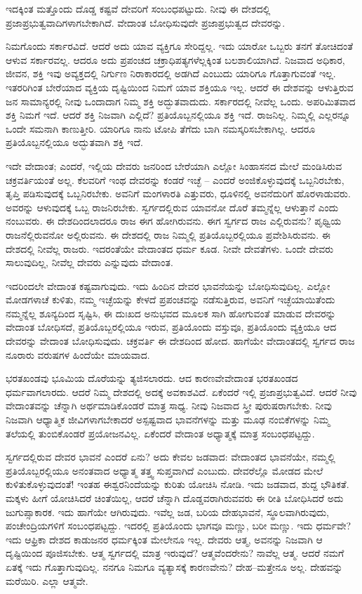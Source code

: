 ಇದಕ್ಕಿಂತ ಮತ್ತೊಂದು ದೊಡ್ಡ ಕಷ್ಟವೆ ದೇವರಿಗೆ ಸಂಬಂಧಪಟ್ಟುದು. ನೀವು ಈ ದೇಶದಲ್ಲಿ ಪ್ರಜಾಪ್ರಭುತ್ವವಾದಿಗಳಾಗಬೇಕಾಗಿದೆ. ವೇದಾಂತ ಬೋಧಿಸುವುದೇ ಪ್ರಜಾಪ್ರಭುತ್ವದ ದೇವರನ್ನು.

ನಿಮಗೊಂದು ಸರ್ಕಾರವಿದೆ. ಆದರೆ ಅದು ಯಾವ ವ್ಯಕ್ತಿಗೂ ಸೇರಿದ್ದಲ್ಲ. ಇದು ಯಾರೋ ಒಬ್ಬರು ತನಗೆ ತೋಚಿದಂತೆ ಆಳುವ ಸರ್ಕಾರವಲ್ಲ. ಆದರೂ ಅದು ಪ್ರಪಂಚದ ಚಕ್ರಾಧಿಪತ್ಯಗಳೆಲ್ಲಕ್ಕಿಂತ ಬಲಶಾಲಿಯಾಗಿದೆ. ನಿಜವಾದ ಅಧಿಕಾರ, ಜೀವನ, ಶಕ್ತಿ ಇವು ಅವ್ಯಕ್ತದಲ್ಲಿ ನಿರ್ಗುಣ ನಿರಾಕಾರದಲ್ಲಿ ಅಡಗಿದೆ ಎಂಬುದು ಯಾರಿಗೂ ಗೊತ್ತಾಗುವಂತೆ ಇಲ್ಲ. ಇತರರಿಗಿಂತ ಬೇರೆಯಾದ ವ್ಯಕ್ತಿಯ ದೃಷ್ಟಿಯಿಂದ ನಿಮಗೆ ಯಾವ ಶಕ್ತಿಯೂ ಇಲ್ಲ. ಆದರೆ ಈ ದೇಶವನ್ನು ಆಳುತ್ತಿರುವ ಜನ ಸಾಮಾನ್ಯರಲ್ಲಿ ನೀವು ಒಂದಾದಾಗ ನಿಮ್ಮ ಶಕ್ತಿ ಅದ್ಭುತವಾದುದು. ಸರ್ಕಾರದಲ್ಲಿ ನೀವೆಲ್ಲ ಒಂದು. ಅಪರಿಮಿತವಾದ ಶಕ್ತಿ ನಿಮಗೆ ಇದೆ. ಆದರೆ ಶಕ್ತಿ ನಿಜವಾಗಿ ಎಲ್ಲಿದೆ? ಪ್ರತಿಯೊಬ್ಬನಲ್ಲಿಯೂ ಶಕ್ತಿ ಇದೆ. ರಾಜನಿಲ್ಲ. ನಿಮ್ಮಲ್ಲಿ ಎಲ್ಲರನ್ನೂ ಒಂದೇ ಸಮನಾಗಿ ಕಾಣುತ್ತೀರಿ. ಯಾರಿಗೂ ನಾನು ಟೋಪಿ ತೆಗೆದು ಬಾಗಿ ನಮಸ್ಕರಿಸಬೇಕಾಗಿಲ್ಲ. ಆದರೂ ಪ್ರತಿಯೊಬ್ಬನಲ್ಲಿಯೂ ಅದ್ಭುತವಾಗಿ ಶಕ್ತಿ ಇದೆ.

ಇದೇ ವೇದಾಂತ; ಎಂದರೆ, ಇಲ್ಲಿಯ ದೇವರು ಜನರಿಂದ ಬೇರೆಯಾಗಿ ಎಲ್ಲೋ ಸಿಂಹಾಸನದ ಮೇಲೆ ಮಂಡಿಸಿರುವ ಚಕ್ರವರ್ತಿಯಂತೆ ಅಲ್ಲ. ಕೆಲವರಿಗೆ ಇಂಥ ದೇವರನ್ನು ಕಂಡರೆ ಇಚ್ಛೆ – ಎಂದರೆ ಅಂಜಿಕೊಳ್ಳುವುದಕ್ಕೆ ಒಬ್ಬನಿರಬೇಕು, ತೃಪ್ತಿ ಪಡಿಸುವುದಕ್ಕೆ ಒಬ್ಬನಿರಬೇಕು. ಅವನಿಗೆ ಮಂಗಳಾರತಿ ಎತ್ತುವರು, ಧೂಳಿನಲ್ಲಿ ಅವನೆದುರಿಗೆ ಹೊರಳಾಡುವರು. ಅವರನ್ನು ಆಳುವುದಕ್ಕೆ ಒಬ್ಬ ರಾಜನಿರಬೇಕು. ಸ್ವರ್ಗದಲ್ಲಿರುವ ಯಾವನೋ ದೊರೆ ತಮ್ಮನ್ನೆಲ್ಲ ಆಳುತ್ತಾನೆ ಎಂದು ನಂಬುವರು. ಈ ದೇಶದಿಂದಲಾದರೂ ರಾಜ ಈಗ ಹೋಗಿರುವನು. ಈಗ ಸ್ವರ್ಗದ ರಾಜ ಎಲ್ಲಿರುವನು? ಪೃಥ್ವಿಯ ರಾಜನೆಲ್ಲಿರುವನೋ ಅಲ್ಲಿರುವನು. ಈ ದೇಶದಲ್ಲಿ ರಾಜ ನಿಮ್ಮಲ್ಲಿ ಪ್ರತಿಯೊಬ್ಬರಲ್ಲಿಯೂ ಪ್ರವೇಶಿಸಿರುವನು. ಈ ದೇಶದಲ್ಲಿ ನೀವೆಲ್ಲ ರಾಜರು. ಇದರಂತೆಯೇ ವೇದಾಂತದ ಧರ್ಮ ಕೂಡ. ನೀವೇ ದೇವತೆಗಳು. ಒಂದೇ ದೇವರು ಸಾಲುವುದಿಲ್ಲ, ನೀವೆಲ್ಲ ದೇವರು ಎನ್ನುವುದು ವೇದಾಂತ.

ಇದರಿಂದಲೇ ವೇದಾಂತ ಕಷ್ಟವಾಗುವುದು. ಇದು ಹಿಂದಿನ ದೇವರ ಭಾವನೆಯನ್ನು ಬೋಧಿಸುವುದಿಲ್ಲ. ಎಲ್ಲೋ ಮೋಡಗಳಾಚೆ ಕುಳಿತು, ನಮ್ಮ ಇಚ್ಛೆಯನ್ನು ಕೇಳದೆ ಪ್ರಪಂಚವನ್ನು ನಡೆಸುತ್ತಿರುವ, ಅವನಿಗೆ ಇಚ್ಛೆಯಾಯಿತೆಂದು ನಮ್ಮನ್ನೆಲ್ಲ ಶೂನ್ಯದಿಂದ ಸೃಷ್ಟಿಸಿ, ಈ ದುಃಖದ ಅನುಭವದ ಮೂಲಕ ಸಾಗಿ ಹೋಗುವಂತೆ ಮಾಡುವ ದೇವರನ್ನು ವೇದಾಂತ ಬೋಧಿಸದೆ, ಪ್ರತಿಯೊಬ್ಬರಲ್ಲಿಯೂ ಇರುವ, ಪ್ರತಿಯೊಂದು ವಸ್ತುವೂ, ಪ್ರತಿಯೊಂದು ವ್ಯಕ್ತಿಯೂ ಆದ ದೇವರನ್ನು ವೇದಾಂತ ಬೋಧಿಸುವುದು. ಚಕ್ರವರ್ತಿ ಈ ದೇಶದಿಂದ ಹೋದ. ಹಾಗೆಯೇ ವೇದಾಂತದಲ್ಲಿ ಸ್ವರ್ಗದ ರಾಜ ನೂರಾರು ವರುಷಗಳ ಹಿಂದೆಯೇ ಮಾಯವಾದ.

ಭರತಖಂಡವು ಭೂಮಿಯ ದೊರೆಯನ್ನು ತ್ಯಜಿಸಲಾರದು. ಆದ ಕಾರಣವೇ\break ವೇದಾಂತ ಭರತಖಂಡದ ಧರ್ಮವಾಗಲಾರದು. ಆದರೆ ನಿಮ್ಮ ದೇಶದಲ್ಲಿ ಅದಕ್ಕೆ ಅವಕಾಶವಿದೆ. ಏಕೆಂದರೆ ಇಲ್ಲಿ ಪ್ರಜಾಪ್ರಭುತ್ವವಿದೆ. ಆದರೆ ನೀವು ವೇದಾಂತವನ್ನು ಚೆನ್ನಾಗಿ ಅರ್ಥಮಾಡಿಕೊಂಡರೆ ಮಾತ್ರ ಸಾಧ್ಯ. ನೀವು ನಿಜವಾದ ಸ್ತ್ರೀ ಪುರುಷರಾಗಬೇಕು. ನೀವು ನಿಜವಾಗಿ ಆಧ್ಯಾತ್ಮಿಕ ಜೀವಿಗಳಾಗಬೇಕಾದರೆ ಅಸ್ಪಷ್ಟವಾದ ಭಾವನೆಗಳನ್ನು ಮತ್ತು ಮೂಢ ನಂಬಿಕೆಗಳನ್ನು ನಿಮ್ಮ ತಲೆಯಲ್ಲಿ ತುಂಬಿಕೊಂಡರೆ ಪ್ರಯೋಜನವಿಲ್ಲ. ಏಕೆಂದರೆ ವೇದಾಂತ ಅಧ್ಯಾತ್ಮಕ್ಕೆ ಮಾತ್ರ ಸಂಬಂಧಪಟ್ಟದ್ದು.

ಸ್ವರ್ಗದಲ್ಲಿರುವ ದೇವರ ಭಾವನೆ ಎಂದರೆ ಏನು? ಅದು ಕೇವಲ ಜಡವಾದ: ವೇದಾಂತದ ಭಾವನೆಯೇ, ನಮ್ಮಲ್ಲಿ ಪ್ರತಿಯೊಬ್ಬರಲ್ಲಿಯೂ ಅನಂತವಾದ ಅಧ್ಯಾತ್ಮ ತತ್ತ್ವ ಸುಪ್ತವಾಗಿದೆ ಎಂಬುದು. ದೇವರೆಲ್ಲೊ ಮೋಡದ ಮೇಲೆ ಕುಳಿತುಕೊಳ್ಳುವುದಂತೆ! ಇಂತಹ ಈಶ್ವರನಿಂದೆಯನ್ನು ಕುರಿತು ಯೋಚಿಸಿ ನೋಡಿ. ಇದು ಜಡವಾದ, ಶುದ್ದ ಭೌತಿಕತೆ. ಮಕ್ಕಳು ಹೀಗೆ ಯೋಚಿಸಿದರೆ ಚಿಂತೆಯಿಲ್ಲ, ಆದರೆ ಚೆನ್ನಾಗಿ ದೊಡ್ಡವರಾಗಿರುವವರು ಈ ರೀತಿ ಬೋಧಿಸಿದರೆ ಅದು ಜುಗುಪ್ಸಾಕಾರಕ. ಇದು ಹಾಗೆಯೇ ಆಗಿರುವುದು. ಇವೆಲ್ಲ ಜಡ, ಬರಿಯ ದೇಹಭಾವನೆ, ಸ್ಥೂಲವಾಗಿರುವುದು, ಪಂಚೇಂದ್ರಿಯಗಳಿಗೆ ಸಂಬಂಧಪಟ್ಟದ್ದು. ಇದರಲ್ಲಿ ಪ್ರತಿಯೊಂದು ಭಾಗವೂ ಮಣ್ಣು, ಬರೀ ಮಣ್ಣು. ಇದು ಧರ್ಮವೇ? ಇದು ಆಫ್ರಿಕಾ ದೇಶದ ಕಾಡುಜನರ ಧರ್ಮಕ್ಕಿಂತ ಮೇಲೇನೂ ಇಲ್ಲ. ದೇವರು ಆತ್ಮ, ಅವನನ್ನು ನಿಜವಾಗಿ ಆ ದೃಷ್ಟಿಯಿಂದ ಪೂಜಿಸಬೇಕು. ಆತ್ಮ ಸ್ವರ್ಗದಲ್ಲಿ ಮಾತ್ರ ಇರುವುದೆ? ಆತ್ಮವೆಂದರೇನು? ನಾವೆಲ್ಲ ಆತ್ಮ. ಆದರೆ ನಮಗೆ ಏತಕ್ಕೆ ಇದು ಗೊತ್ತಾಗುವುದಿಲ್ಲ. ನನಗೂ ನಿಮಗೂ ವ್ಯತ್ಯಾಸಕ್ಕೆ ಕಾರಣವೇನು? ದೇಹ–ಮತ್ತೇನೂ ಅಲ್ಲ. ದೇಹವನ್ನು ಮರೆಯಿರಿ. ಎಲ್ಲಾ ಆತ್ಮವೇ.


